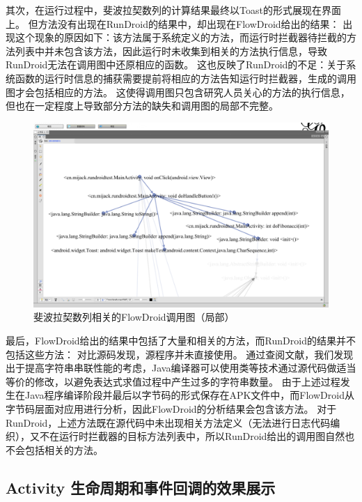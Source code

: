 其次，在运行过程中，斐波拉契数列的计算结果最终以Toast的形式展现在界面上。
但方法没有出现在RunDroid的结果中，却出现在FlowDroid给出的结果：
出现这个现象的原因如下：该方法属于系统定义的方法，而运行时拦截器待拦截的方法列表中并未包含该方法，因此运行时未收集到相关的方法执行信息，导致RunDroid无法在调用图中还原相应的函数。
这也反映了RunDroid的不足：关于系统函数的运行时信息的捕获需要提前将相应的方法告知运行时拦截器，生成的调用图才会包括相应的方法。
这使得调用图只包含研究人员关心的方法的执行信息，但也在一定程度上导致部分方法的缺失和调用图的局部不完整。


\begin{figure}[!ht]
	\centering
	\includegraphics[width=\textwidth]{./Figures/FlowDroid-Fibonacci.png}
	\caption{斐波拉契数列相关的FlowDroid调用图（局部）}
	\label{fig:flowdroid-result-Fibonacci}
\end{figure}


最后，FlowDroid给出的结果中包括了大量和相关的方法，而RunDroid的结果并不包括这些方法：
对比源码发现，源程序并未直接使用。
通过查阅文献\cite{gosling2000java}，我们发现出于提高字符串串联性能的考虑，Java编译器可以使用类等技术通过源代码做适当等价的修改，以避免表达式求值过程中产生过多的字符串数量。
由于上述过程发生在Java程序编译阶段并最后以字节码的形式保存在APK文件中，而FlowDroid从字节码层面对应用进行分析，因此FlowDroid的分析结果会包含该方法。
对于RunDroid，上述方法既在源代码中未出现相关方法定义（无法进行日志代码编织），又不在运行时拦截器的目标方法列表中，所以RunDroid给出的调用图自然也不会包括相关的方法。



\subsection{Activity 生命周期和事件回调的效果展示}

